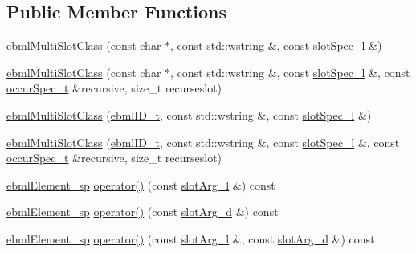 \subsection*{Public Member Functions}
\begin{DoxyCompactItemize}
\item 
\mbox{\hyperlink{classebml_1_1ebmlMultiSlotClass_ac21125f15a5af98e4aa6e8ce494c8667}{ebml\+Multi\+Slot\+Class}} (const char $\ast$, const std\+::wstring \&, const \mbox{\hyperlink{namespaceebml_abdc1248164e4e424423defac9fff7d4d}{slot\+Spec\+\_\+l}} \&)
\item 
\mbox{\hyperlink{classebml_1_1ebmlMultiSlotClass_a455cc78a25f193348d71a2f7f079dd98}{ebml\+Multi\+Slot\+Class}} (const char $\ast$, const std\+::wstring \&, const \mbox{\hyperlink{namespaceebml_abdc1248164e4e424423defac9fff7d4d}{slot\+Spec\+\_\+l}} \&, const \mbox{\hyperlink{structebml_1_1occurSpec__t}{occur\+Spec\+\_\+t}} \&recursive, size\+\_\+t recurseslot)
\item 
\mbox{\hyperlink{classebml_1_1ebmlMultiSlotClass_ac96d2f773a6c8e18731732c97a783fe6}{ebml\+Multi\+Slot\+Class}} (\mbox{\hyperlink{namespaceebml_a86c5f604ddf12a74aa9812e997a58691}{ebml\+I\+D\+\_\+t}}, const std\+::wstring \&, const \mbox{\hyperlink{namespaceebml_abdc1248164e4e424423defac9fff7d4d}{slot\+Spec\+\_\+l}} \&)
\item 
\mbox{\hyperlink{classebml_1_1ebmlMultiSlotClass_ac657dd7c6bd7a89928df88babbff9009}{ebml\+Multi\+Slot\+Class}} (\mbox{\hyperlink{namespaceebml_a86c5f604ddf12a74aa9812e997a58691}{ebml\+I\+D\+\_\+t}}, const std\+::wstring \&, const \mbox{\hyperlink{namespaceebml_abdc1248164e4e424423defac9fff7d4d}{slot\+Spec\+\_\+l}} \&, const \mbox{\hyperlink{structebml_1_1occurSpec__t}{occur\+Spec\+\_\+t}} \&recursive, size\+\_\+t recurseslot)
\item 
\mbox{\hyperlink{namespaceebml_adad533b7705a16bb360fe56380c5e7be}{ebml\+Element\+\_\+sp}} \mbox{\hyperlink{classebml_1_1ebmlMultiSlotClass_a96e8fd5660f5802d19f140b0dc0d042a}{operator()}} (const \mbox{\hyperlink{namespaceebml_ae432575dfbb3e141ce897442794f0ca5}{slot\+Arg\+\_\+l}} \&) const
\item 
\mbox{\hyperlink{namespaceebml_adad533b7705a16bb360fe56380c5e7be}{ebml\+Element\+\_\+sp}} \mbox{\hyperlink{classebml_1_1ebmlMultiSlotClass_a2a4b742e61f4efc0b8e9e686908424d2}{operator()}} (const \mbox{\hyperlink{namespaceebml_a4317d4c495715eced3ed448c2d05caeb}{slot\+Arg\+\_\+d}} \&) const
\item 
\mbox{\hyperlink{namespaceebml_adad533b7705a16bb360fe56380c5e7be}{ebml\+Element\+\_\+sp}} \mbox{\hyperlink{classebml_1_1ebmlMultiSlotClass_a6eaf23b998e3b91075f824842e746bbf}{operator()}} (const \mbox{\hyperlink{namespaceebml_ae432575dfbb3e141ce897442794f0ca5}{slot\+Arg\+\_\+l}} \&, const \mbox{\hyperlink{namespaceebml_a4317d4c495715eced3ed448c2d05caeb}{slot\+Arg\+\_\+d}} \&) const

\end{DoxyCompactItemize}
